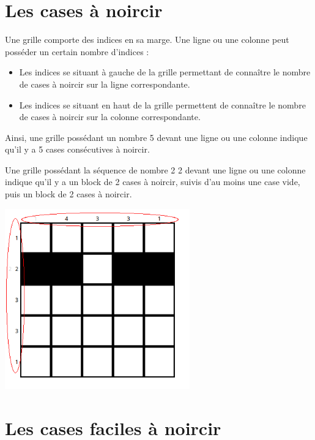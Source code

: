 \documentclass[a4paper, 12pt]{report}
\begin{document}
		\section{Les cases à noircir}
    
            Une grille comporte des indices en sa marge. Une ligne ou une colonne peut posséder un certain nombre d'indices :
            \begin{itemize}
                \item Les indices se situant à gauche de la grille permettant de connaître le nombre de cases à noircir sur la ligne correspondante.
                \item Les indices se situant en haut de la grille permettent de connaître le nombre de cases à noircir sur la colonne correspondante.
            \end{itemize}
	        
	        Ainsi, une grille possédant un nombre 5 devant une ligne ou une colonne indique qu'il y a 5 cases consécutives à noircir.
	        
	        Une grille possédant la séquence de nombre 2 2 devant une ligne ou une colonne indique qu'il y a un block de 2 cases à noircir, suivis d'au moins une case vide, puis un block de 2 cases à noircir.

            \begin{minipage}{\linewidth}
                    \centering
			        \includegraphics[width=8cm]{exempleIndice.png}
	        \end{minipage}

		\section{Les cases faciles à noircir}
\end{document}
